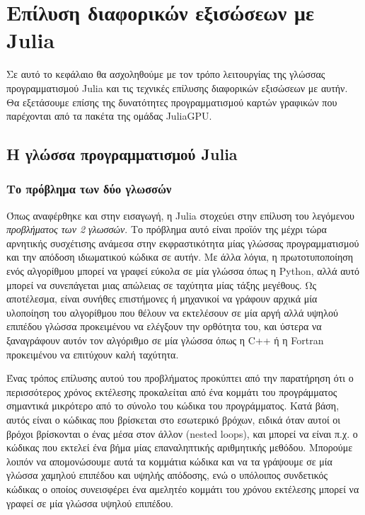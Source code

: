 \chapter{Επίλυση διαφορικών εξισώσεων με Julia}
\label{chapter:julia-diffeq}

Σε αυτό το κεφάλαιο θα ασχοληθούμε με τον τρόπο λειτουργίας της γλώσσας προγραμματισμού Julia και τις τεχνικές επίλυσης διαφορικών εξισώσεων με αυτήν.
Θα εξετάσουμε επίσης της δυνατότητες προγραμματισμού καρτών γραφικών που παρέχονται από τα πακέτα της ομάδας JuliaGPU.

\section{Η γλώσσα προγραμματισμού Julia}

\subsection{Το πρόβλημα των δύο γλωσσών}

Όπως αναφέρθηκε και στην εισαγωγή, η Julia στοχεύει στην επίλυση του λεγόμενου \emph{προβλήματος των 2 γλωσσών}.
Το πρόβλημα αυτό είναι προϊόν της μέχρι τώρα αρνητικής συσχέτισης ανάμεσα στην εκφραστικότητα μίας γλώσσας προγραμματισμού και την απόδοση ιδιωματικού κώδικα σε αυτήν.
Με άλλα λόγια, η πρωτοτυποποίηση ενός αλγορίθμου μπορεί να γραφεί εύκολα σε μία γλώσσα όπως η Python, αλλά αυτό μπορεί να συνεπάγεται μιας απώλειας σε ταχύτητα μίας τάξης μεγέθους.
Ως αποτέλεσμα, είναι συνήθες επιστήμονες ή μηχανικοί να γράφουν αρχικά μία υλοποίηση του αλγορίθμου που θέλουν να εκτελέσουν σε μία αργή αλλά υψηλού επιπέδου γλώσσα προκειμένου να ελέγξουν την ορθότητα του, και ύστερα να ξαναγράφουν αυτόν τον αλγόριθμο σε μία γλώσσα όπως η C++ ή η Fortran προκειμένου να επιτύχουν καλή ταχύτητα.

Ένας τρόπος επίλυσης αυτού του προβλήματος προκύπτει από την παρατήρηση ότι ο περισσότερος χρόνος εκτέλεσης προκαλείται από ένα κομμάτι του προγράμματος σημαντικά μικρότερο από το σύνολο του κώδικα του προγράμματος.
Κατά βάση, αυτός είναι ο κώδικας που βρίσκεται στο εσωτερικό βρόχων, ειδικά όταν αυτοί οι βρόχοι βρίσκονται ο ένας μέσα στον άλλον (nested loops), και μπορεί να είναι π.χ. ο κώδικας που εκτελεί ένα βήμα μίας επαναληπτικής αριθμητικής μεθόδου.
Μπορούμε λοιπόν να απομονώσουμε αυτά τα κομμάτια κώδικα και να τα γράψουμε σε μία γλώσσα χαμηλού επιπέδου και υψηλής απόδοσης, ενώ ο υπόλοιπος συνδετικός κώδικας ο οποίος συνεισφέρει ένα αμελητέο κομμάτι του χρόνου εκτέλεσης μπορεί να γραφεί σε μία γλώσσα υψηλού επιπέδου.

